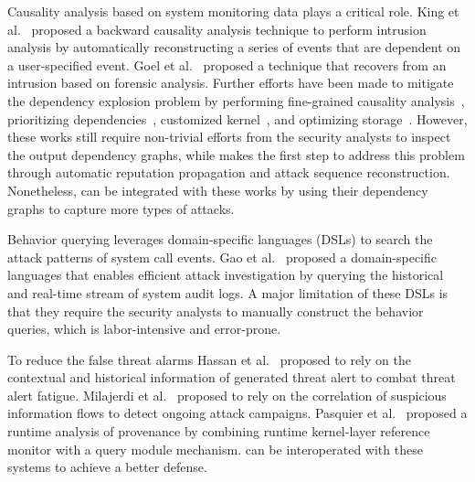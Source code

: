 %
Causality analysis based on system monitoring data plays a critical role.
King et al.~\cite{backtracking,backtracking2} proposed a backward causality analysis
technique to perform intrusion analysis by 
automatically reconstructing a series of events that are dependent on a user-specified event.
Goel et al.~\cite{taser} proposed a technique that recovers from an intrusion
based on forensic analysis.
Further efforts have been made to mitigate the dependency explosion problem by performing fine-grained causality analysis~\cite{beep,ma2016protracer,mcitracking}, prioritizing dependencies~\cite{liu2018priotracker}, customized kernel~\cite{trustkernel}, and optimizing storage~\cite{loggc,reduction,reduction2}. 
%
%
%
However, these works still require non-trivial efforts from the security analysts to inspect the output dependency graphs, while \tool makes the first step to address this problem through automatic reputation propagation and attack sequence reconstruction. 
Nonetheless, \tool can be integrated with these works by using their dependency graphs to capture more types of attacks.

Behavior querying leverages domain-specific languages (DSLs) to search the attack patterns of system call events.
Gao et al.~\cite{gao2018aiql,gao2018saql} proposed a domain-specific languages that enables efficient attack investigation by querying the historical and real-time stream of system audit logs.
A major limitation of these DSLs is that they require the security analysts to manually construct the behavior queries, which is labor-intensive and error-prone.

To reduce the false threat alarms
Hassan et al.~\cite{hassan2019nodoze} proposed to rely on the contextual and historical information of generated threat alert to combat threat alert fatigue.
Milajerdi et al.~\cite{HOLMES} proposed to rely on the correlation of suspicious information flows to detect ongoing attack campaigns.
Pasquier et al.~\cite{pasquier2018runtime} proposed a runtime analysis of provenance by combining runtime kernel-layer reference monitor with a query module mechanism. 
\tool can be interoperated with these 
systems to achieve a better defense.

